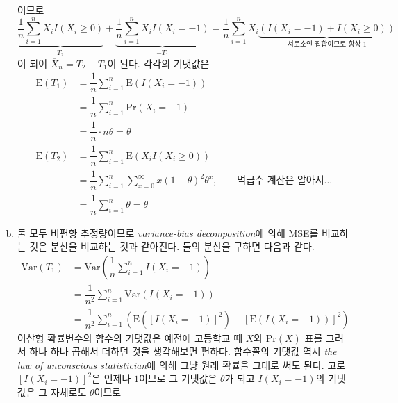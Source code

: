 \documentclass[answers]{exam}
\begin{document}
\begin{questions}
\begin{solution}
\begin{enumerate}[(a)]
        이므로
        \begin{equation}
          \underbrace{\dfrac{1}{n}\sum_{i=1}^{n}X_{i}I\left(X_{i}\geq 0\right)}_{T_{2}}+\underbrace{\dfrac{1}{n}\sum_{i=1}^{n}X_{i}I\left(X_{i}=-1\right)}_{-T_{1}}= \dfrac{1}{n}\sum_{i=1}^{n}X_{i}\underbrace{\left(I\left(X_{i}=-1\right)+I\left(X_{i}\geq 0\right)\right)}_{\text{서로소인 집합이므로 항상 1}}
        \end{equation}
        이 되어 $\overline{X}_{n}=T_{2}-T_{1}$이 된다. 각각의 기댓값은
        \begin{align}
          \mathrm{E}\left(T_{1}\right) &= \dfrac{1}{n}\sum_{i=1}^{n}\mathrm{E}\left(I\left(X_{i}=-1\right)\right)\\
          &= \dfrac{1}{n}\sum_{i=1}^{n}\mathrm{Pr}\left(X_{i}=-1\right)\\
          &= \dfrac{1}{n}\cdot n\theta = \theta\\
          \mathrm{E}\left(T_{2}\right) &= \dfrac{1}{n}\sum_{i=1}^{n}\mathrm{E}\left(X_{i}I\left(X_{i}\geq 0\right)\right)\\
          &= \dfrac{1}{n}\sum_{i=1}^{n}\sum_{x=0}^{\infty}x\left(1-\theta\right)^{2}\theta^{x},\qquad \text{멱급수 계산은 알아서...}\\
          &= \dfrac{1}{n}\sum_{i=1}^{n}\theta=\theta
        \end{align}
        \item 둘 모두 비편향 추정량이므로 \emph{variance-bias decomposition}에 의해 MSE를 비교하는 것은 분산을 비교하는 것과 같아진다. 둘의 분산을 구하면 다음과 같다.
        \begin{align}
          \mathrm{Var}\left(T_{1}\right) &= \mathrm{Var}\left(\dfrac{1}{n}\sum_{i=1}^{n}I\left(X_{i}=-1\right)\right)\\
          &=\dfrac{1}{n^{2}}\sum_{i=1}^{n}\mathrm{Var}\left(I\left(X_{i}=-1\right)\right)\\
          &= \dfrac{1}{n^{2}}\sum_{i=1}^{n}\left(\mathrm{E}\left(\left[I\left(X_{i}=-1\right)\right]^{2}\right)-\left[\mathrm{E}\left(I\left(X_{i}=-1\right)\right) \right]^{2}\right)
        \end{align}
        이산형 확률변수의 함수의 기댓값은 예전에 고등학교 때 $X$와 $\mathrm{Pr}\left(X\right)$ 표를 그려서 하나 하나 곱해서 더하던 것을 생각해보면 편하다. 함수꼴의 기댓값 역시 \emph{the law of unconscious statistician}에 의해 그냥 원래 확률을 그대로 써도 된다. 고로 $\left[I\left(X_{i}=-1\right)\right]^{2}$은 언제나 $1$이므로 그 기댓값은 $\theta$가 되고 $I\left(X_{i}=-1\right)$의 기댓값은 그 자체로도 $\theta$이므로

\end{enumerate}
\end{solution}
\end{questions}
\end{document}
